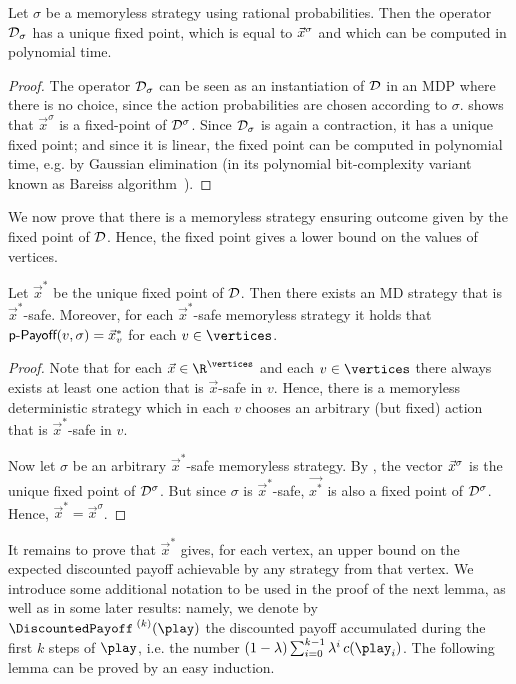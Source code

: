 \begin{lemma}
\label{5-lem:disc-val-sigma}
Let $\sigma$ be a memoryless strategy using rational probabilities. Then the operator $\mathcal{D}_{\sigma}$ has a unique fixed point, which is equal to $\vec{x}^{\sigma}$ and which can be computed in polynomial time.
\end{lemma}
\begin{proof}
The operator $\mathcal{D}_{\sigma}$ can be seen as an instantiation of $\mathcal{D}$ in an MDP where there is no choice, since the action probabilities are chosen according to $\sigma$.  shows that 
$\vec{x}^\sigma$ is a fixed-point of $\mathcal{D}^\sigma$. Since $\mathcal{D}_{\sigma}$ is again a contraction, it has a unique fixed point; and since it is linear, the fixed point can be computed in polynomial time, e.g. by Gaussian elimination (in its polynomial bit-complexity variant known as Bareiss algorithm~\cite{Bareiss:1968}).
\end{proof}

We now prove that there is a memoryless strategy ensuring outcome given by the fixed point of $\mathcal{D}$. Hence, the fixed point gives a lower bound on the values of vertices.

\begin{lemma}
\label{5-lem:disc-val-lower}
Let $\vec{x}^*$ be the unique fixed point of $\mathcal{D}$. 
Then there exists an MD strategy that is $\vec{x}^*$-safe. Moreover, for each $\vec{x}^*$-safe memoryless strategy it holds that  
$\textsf{p-Payoff}(v,\sigma) =\vec{x}_v^*$ for each $v\in \vertices$.
\end{lemma}
\begin{proof}
 Note that for each $\vec{x}\in \R^{\vertices}$ and each $v\in 
\vertices$ there always exists at least one action that is $\vec{x}$-safe in 
$v$. Hence, there is a memoryless deterministic strategy which 
in each $v$ chooses an arbitrary (but fixed) action that is $\vec{x}^*$-safe in 
$v$. 

Now let $ \sigma $ be an arbitrary $\vec{x}^*$-safe memoryless strategy.
By , the vector $\vec{x}^{\sigma}$ is the unique fixed point of $\mathcal{D}^\sigma$.
 But since $\sigma$ 
is $\vec{x}^*$-safe, $\vec{x^*}$ is also a fixed point of $\mathcal{D}^\sigma$. 
Hence, $\vec{x}^* = \vec{x}^\sigma$.
\end{proof}

It remains to prove that $\vec{x}^*$ gives, for each vertex, an upper 
bound on the expected discounted payoff achievable by any strategy from that 
vertex. We introduce some additional notation to be used in the proof of the 
next lemma, as well as in some later results: namely, we denote by 
$\dPayoffStep{k}(\play)$ the 
discounted 
payoff accumulated during the first $k$ steps of $\play$, i.e. the number 
$(1-\lambda)\sum_{i=0}^{k-1} \lambda^i
\, \colouring(\play_i)$. The following lemma can be proved by an easy induction.

